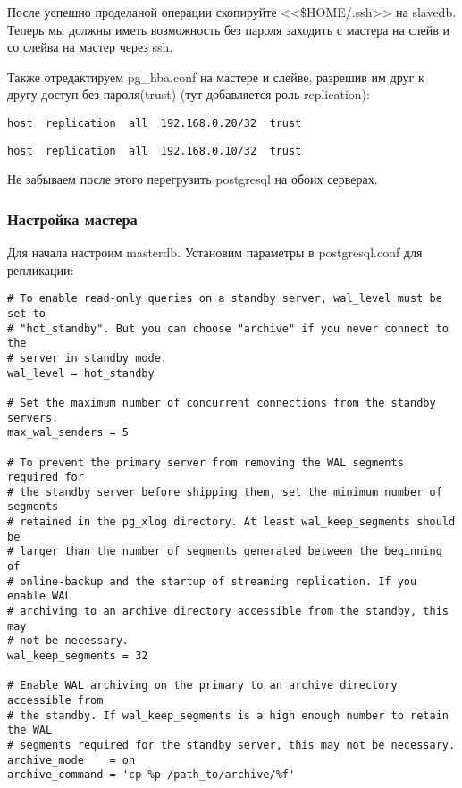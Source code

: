 После успешно проделаной операции скопируйте <<\$HOME/.ssh>> на slavedb. 
Теперь мы должны иметь возможность без пароля заходить с мастера на слейв и со слейва на мастер через ssh.

Также отредактируем pg\_hba.conf на мастере и слейве, разрешив им друг к другу доступ без пароля(trust) (тут добавляется роль replication):
\begin{lstlisting}[label=lst:streaming7,caption=Мастер pg\_hba.conf]
host  replication  all  192.168.0.20/32  trust
\end{lstlisting}
\begin{lstlisting}[label=lst:streaming8,caption=Слейв pg\_hba.conf]
host  replication  all  192.168.0.10/32  trust
\end{lstlisting}

Не забываем после этого перегрузить postgresql на обоих серверах.

\subsubsection{Настройка мастера}
Для начала настроим masterdb. Установим параметры в postgresql.conf для репликации:
\begin{lstlisting}[label=lst:streaming9,caption=Настройка мастера]
# To enable read-only queries on a standby server, wal_level must be set to
# "hot_standby". But you can choose "archive" if you never connect to the
# server in standby mode.
wal_level = hot_standby

# Set the maximum number of concurrent connections from the standby servers.
max_wal_senders = 5

# To prevent the primary server from removing the WAL segments required for
# the standby server before shipping them, set the minimum number of segments
# retained in the pg_xlog directory. At least wal_keep_segments should be
# larger than the number of segments generated between the beginning of
# online-backup and the startup of streaming replication. If you enable WAL
# archiving to an archive directory accessible from the standby, this may
# not be necessary.
wal_keep_segments = 32

# Enable WAL archiving on the primary to an archive directory accessible from
# the standby. If wal_keep_segments is a high enough number to retain the WAL
# segments required for the standby server, this may not be necessary.
archive_mode    = on
archive_command = 'cp %p /path_to/archive/%f'
\end{lstlisting}

